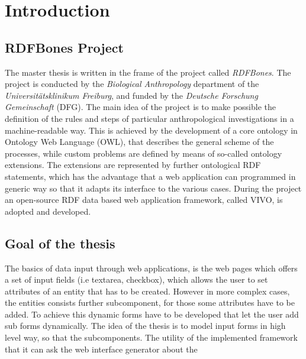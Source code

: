 \chapter{Introduction}


\section{RDFBones Project}

The master thesis is written in the frame of the project called \textit{RDFBones}. The project is conducted by the \textit{Biological Anthropology} department of the \textit{Universitätsklinikum Freiburg}, and funded by the \textit{Deutsche Forschung Gemeinschaft} (DFG). The main idea of the project is to make possible the definition of the rules and steps of particular anthropological investigations in a machine-readable way. This is achieved by the development of a core ontology in Ontology Web Language (OWL), that describes the general scheme of the processes, while custom problems are defined by means of so-called ontology extensions. The extensions are represented by further ontological RDF statements, which has the advantage that a web application can programmed in generic way so that it adapts its interface to the various cases. During the project an open-source RDF data based web application framework, called VIVO, is adopted and developed.

\section{Goal of the thesis}

The basics of data input through web applications, is the web pages which offers a set of input fields (i.e textarea, checkbox), which allows the user to set attributes of an entity that has to be created. However in more complex cases, the entities consists further subcomponent, for those some attributes have to be added. To achieve this dynamic forms have to be developed that let the user add sub forms dynamically. The idea of the thesis is to model input forms in high level way, so that the subcomponents. The utility of the implemented framework that it can ask the web interface generator about the 







 






